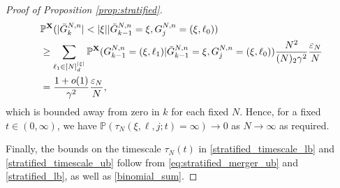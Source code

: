 \documentclass[10pt,a4paper]{amsart}
\newcommand{\bbP}{\mathbb{P}}
\newcommand{\bfX}{\mathbf{X}}
\begin{document}
\begin{proof}[Proof of Proposition \ref{prop:stratified}]
\begin{align}
&\bbP^{ \bfX }( | \bar{ G }_k^{ N, n } | < | \xi | | \bar{ G }_{ k - 1 }^{ N, n } = \xi, G_j^{ N, n } = ( \xi, \ell_0 ) ) \notag \\
&\geq \sum_{ \ell_1 \in [ N ]_d^{ | \xi | } } \bbP^{ \bfX }( G_{ k - 1 }^{ N, n } = ( \xi, \ell_1 ) | \bar{ G }_{ k - 1 }^{ N, n } = \xi, G_j^{ N, n } = ( \xi, \ell_0 ) ) \frac{ N^2 }{ ( N )_2 \gamma^2 } \frac{\varepsilon_N}{N} \notag \\
&= \frac{ 1 + o( 1 ) }{ \gamma^2 } \frac{\varepsilon_N}{N}, \label{stratified_lb}
\end{align}
which is bounded away from zero in $k$ for each fixed $N$.
Hence, for a fixed $t \in (0, \infty)$, we have $\bbP( \tau_N( \xi, \ell, j; t ) = \infty ) \to 0$ as $N \to \infty$ as required.

Finally, the bounds on the timescale $\tau_N(t)$ in \eqref{stratified_timescale_lb} and \eqref{stratified_timescale_ub} follow from \eqref{eq:stratified_merger_ub} and \eqref{stratified_lb}, as well as \eqref{binomial_sum}.
\end{proof}
\end{document}
